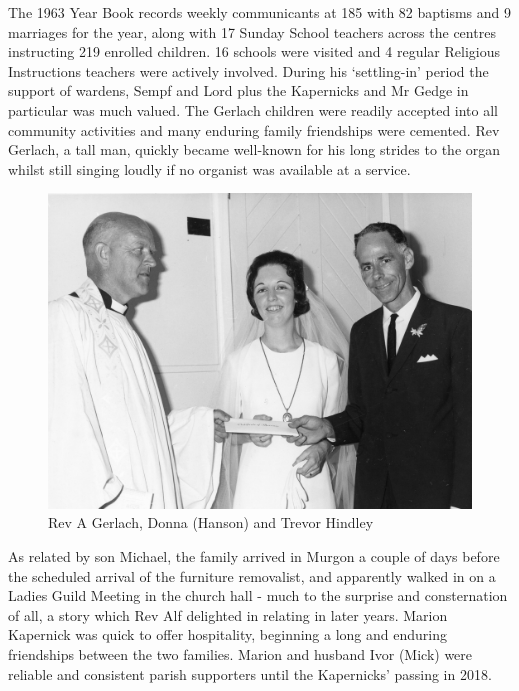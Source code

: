 The 1963 Year Book records weekly communicants at 185 with 82 baptisms and 9 marriages for the year, along with 17 Sunday School teachers across the centres instructing 219 enrolled children. 16 schools were visited and 4 regular Religious Instructions teachers were actively involved. During his `settling-in' period the support of wardens, Sempf and Lord plus the Kapernicks and Mr Gedge in particular was much valued. The Gerlach children were readily accepted into all community activities and many enduring family friendships were cemented. Rev Gerlach, a tall man, quickly became well-known for his long strides to the organ whilst still singing loudly if no organist was available at a service.









\begin{figure}
\begin{center}
\includegraphics[width=1.\linewidth,center]{../images/donnaVestry.jpg}
\caption{Rev A Gerlach, Donna (Hanson) and Trevor Hindley}
\end{center}
\end{figure}




As related by son Michael, the family arrived in Murgon a couple of days before the scheduled arrival of the furniture removalist, and apparently walked in on a Ladies Guild Meeting in the church hall - much to the surprise and consternation of all, a story which Rev Alf delighted in relating in later years. Marion Kapernick was quick to offer hospitality, beginning a long and enduring friendships between the two families. Marion and husband Ivor (Mick) were reliable and consistent parish supporters until the Kapernicks' passing in 2018.



